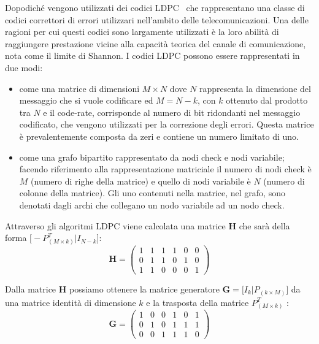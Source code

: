 Dopodich\'e vengono utilizzati dei codici LDPC~\cite{borwankar_low_nodate} che rappresentano una classe di codici correttori di errori utilizzari nell'ambito delle telecomunicazioni. Una delle ragioni per cui questi codici sono largamente utilizzati \`e la loro abilit\`a di raggiungere prestazione vicine alla capacit\`a teorica del canale di comunicazione, nota come il limite di Shannon. I codici LDPC possono essere rappresentati in due modi:
\begin{itemize}
\item come una matrice di dimensioni $M \times N$ dove $N$ rappresenta la dimensione del messaggio che si vuole codificare ed $M = N - k$, con $k$ ottenuto dal prodotto tra $N$ e il code-rate, corrisponde al numero di bit ridondanti nel messaggio codificato, che vengono utilizzati per la correzione degli errori. Questa matrice \`e prevalentemente composta da zeri e contiene un numero limitato di uno.
\item come una grafo bipartito rappresentato da nodi check e nodi variabile; facendo riferimento alla rappresentazione matriciale il numero di nodi check \`e $M$ (numero di righe della matrice) e quello di nodi variabile \`e $N$ (numero di colonne della matrice). Gli uno contenuti nella matrice, nel grafo, sono denotati dagli archi che collegano un nodo variabile ad un nodo check.
\end{itemize}

Attraverso gli algoritmi LDPC viene calcolata una matrice \textbf{H} che sar\`a della forma $\bigl [ -P^T_{(M \times k)} | I_{N-k}\bigr ]$:
\begin{equation}
\textbf{H} =
\begin{pmatrix}
 1 & 1 & 1 & 1 & 0 & 0 \\
 0 & 1 & 1 & 0 & 1 & 0 \\
 1 & 1 & 0 & 0 & 0 & 1
\end{pmatrix}
\end{equation}

Dalla matrice \textbf{H} possiamo ottenere la matrice generatore $\textbf{G} = \bigl [  I_{k} | P_{(k \times M)} \bigr ]$ da una matrice identit\`a di dimensione $k$ e la trasposta della matrice $P^T_{(M \times k)}$ :
\begin{equation}
\textbf{G} =
\begin{pmatrix}
 1 & 0 & 0 & 1 & 0 & 1 \\
 0 & 1 & 0 & 1 & 1 & 1 \\
 0 & 0 & 1 & 1 & 1 & 0
\end{pmatrix}
\end{equation}

